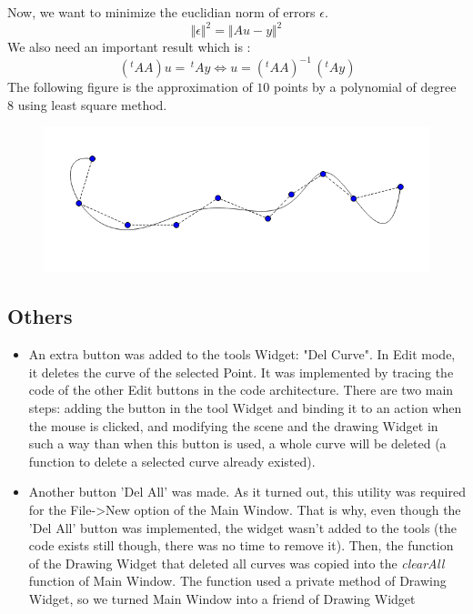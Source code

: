 \documentclass{article}
\begin{document}
 Now, we want to minimize the euclidian norm of errors $\epsilon$.
 \[  
 	\Vert \epsilon \Vert^2 = \Vert Au - y \Vert^2
 \]
 We also need an important result which is : 
 \[ \,(^tAA)u = \,^tAy \iff u =  (^tAA)^{-1}\,(^tAy)\] 
 The following figure is the approximation of $10$ points by a polynomial of degree $8$ using
 least square method.
 \begin{figure}[H]
	\center
   \includegraphics[scale = 0.4]{Pictures/sq1.png}
\end{figure}
\subsection*{Others} %
 \begin{itemize}
 \item An extra button was added to the tools Widget: "Del Curve". In Edit mode, it deletes the curve of the selected Point. It was implemented by tracing the code of the other Edit buttons in the code architecture. There are two main steps: adding the button in the tool Widget and binding it to an action when the mouse is clicked, and modifying the scene and the drawing Widget in such a way than when this button is used, a whole curve will be deleted (a function to delete a selected curve already existed).
 \item Another button 'Del All' was made. As it turned out, this utility was required for the File->New option of the Main Window. That is why, even though the 'Del All' button was implemented, the widget wasn't added to the tools (the code exists still though, there was no time to remove it). Then, the function of the Drawing Widget that deleted all curves was copied into the \textit{clearAll} function of Main Window. The function used a private method of Drawing Widget, so we turned Main Window into a friend of Drawing Widget
   \end{itemize}
\end{document}
